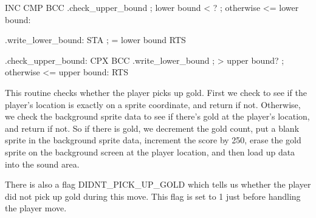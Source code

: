 \documentclass[10pt]{report}
\begin{document}
    INC     
    CMP     
    BCC     .check_upper_bound      ; lower bound < ?
    ; otherwise  <= lower bound:

.write_lower_bound:
    STA            ;  = lower bound
    RTS

.check_upper_bound:
    CPX     
    BCC     .write_lower_bound       ;  > upper bound?
    ; otherwise  <= upper bound:
    RTS
\eatline
{}\nwendcode{}\nwdocspar

This routine checks whether the player picks up gold. First we check to see if the player's location
is exactly on a sprite coordinate, and return if not. Otherwise, we check the background sprite data
to see if there's gold at the player's location, and return if not. So if there is gold, we decrement
the gold count, put a blank sprite in the background sprite data, increment the score by 250, erase
the gold sprite on the background screen at the player location, and then load up data into the sound area.

There is also a flag {\Tt{}DIDNT{\_}PICK{\_}UP{\_}GOLD\nwendquote} which tells us whether the player did not pick up gold during this move. This flag
is set to {\Tt{}1\nwendquote} just before handling the player move.
\end{document}
